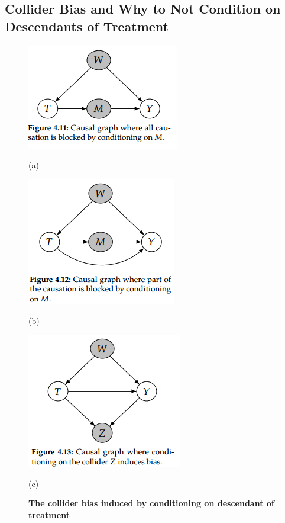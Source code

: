 \documentclass[11pt]{article}
\begin{document}
\subsection{Collider Bias and Why to Not Condition on Descendants of Treatment}
\begin{figure}
\begin{minipage}[t]{0.33\linewidth}
  \centering
  \centerline{\includegraphics[scale = 0.6]{collider_bias_1.png}}
  \vspace{-5pt}
  \centerline{(a)}
\end{minipage}
\begin{minipage}[t]{0.33\linewidth}
  \centering
  \centerline{\includegraphics[scale = 0.6]{collider_bias_2.png}}
  \vspace{-5pt}
  \centerline{(b)}
\end{minipage}
\begin{minipage}[t]{0.33\linewidth}
  \centering
  \centerline{\includegraphics[scale = 0.6]{collider_bias_3.png}}
  \vspace{-5pt}
  \centerline{(c)}
\end{minipage}
\caption{\footnotesize{\textbf{The collider bias induced by conditioning on descendant of treatment \citep{neal2020introduction}}}}
\label{fig: collider_bias}
\end{figure}
\end{document}
